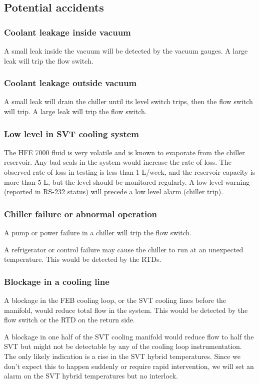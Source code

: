 \documentclass[12pt]{report}
\begin{document}
\subsection{Potential accidents}
\subsubsection*{Coolant leakage inside vacuum}
A small leak inside the vacuum will be detected by the vacuum gauges. A large leak will trip the flow switch.
\subsubsection*{Coolant leakage outside vacuum}
A small leak will drain the chiller until its level switch trips, then the flow switch will trip. A large leak will trip the flow switch.
\subsubsection*{Low level in SVT cooling system}
The HFE 7000 fluid is very volatile and is known to evaporate from the chiller reservoir. Any bad seals in the system would increase the rate of loss. The observed rate of loss in testing is less than 1 L/week, and the reservoir capacity is more than 5 L, but the level should be monitored regularly. A low level warning (reported in RS-232 status) will precede a low level alarm (chiller trip).
\subsubsection*{Chiller failure or abnormal operation}
A pump or power failure in a chiller will trip the flow switch.

A refrigerator or control failure may cause the chiller to run at an unexpected temperature. This would be detected by the RTDs.
\subsubsection*{Blockage in a cooling line}
A blockage in the FEB cooling loop, or the SVT cooling lines before the manifold, would reduce total flow in the system. This would be detected by the flow switch or the RTD on the return side.

A blockage in one half of the SVT cooling manifold would reduce flow to half the SVT but might not be detectable by any of the cooling loop instrumentation. The only likely indication is a rise in the SVT hybrid temperatures. Since we don't expect this to happen suddenly or require rapid intervention, we will set an alarm on the SVT hybrid temperatures but no interlock.
\end{document}
